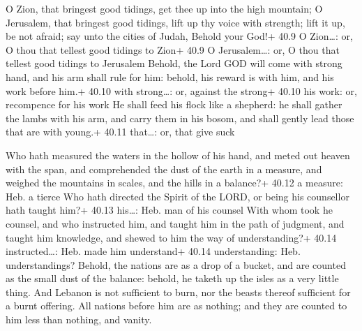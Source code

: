  O Zion, that bringest good tidings, get thee up into the
high mountain; O Jerusalem, that bringest good tidings, lift up thy
voice with strength; lift it up, be not afraid; say unto the cities of
Judah, Behold your God!+ 40.9 O Zion\ldots: or, O thou that tellest good
tidings to Zion+ 40.9 O Jerusalem\ldots: or, O thou that tellest good
tidings to Jerusalem  Behold, the Lord GOD will come with
strong hand, and his arm shall rule for him: behold, his reward is with
him, and his work before him.+ 40.10 with strong\ldots: or, against the
strong+ 40.10 his work: or, recompence for his work  He
shall feed his flock like a shepherd: he shall gather the lambs with his
arm, and carry them in his bosom, and shall gently lead those that are
with young.+ 40.11 that\ldots: or, that give suck

 Who hath measured the waters in the hollow of his hand,
and meted out heaven with the span, and comprehended the dust of the
earth in a measure, and weighed the mountains in scales, and the hills
in a balance?+ 40.12 a measure: Heb. a tierce  Who hath
directed the Spirit of the LORD, or being his counsellor hath taught
him?+ 40.13 his\ldots: Heb. man of his counsel  With whom
took he counsel, and who instructed him, and taught him in the path of
judgment, and taught him knowledge, and shewed to him the way of
understanding?+ 40.14 instructed\ldots: Heb. made him understand+ 40.14
understanding: Heb. understandings?  Behold, the nations
are as a drop of a bucket, and are counted as the small dust of the
balance: behold, he taketh up the isles as a very little thing.
 And Lebanon is not sufficient to burn, nor the beasts
thereof sufficient for a burnt offering.  All nations
before him are as nothing; and they are counted to him less than
nothing, and vanity.

